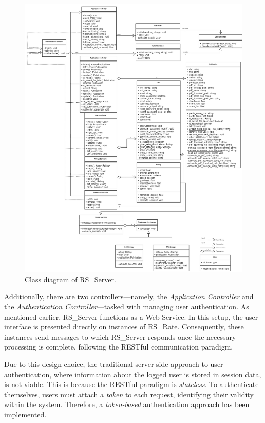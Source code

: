 \documentclass[a4paper, english]{article}
\newcommand{\rsserver}{RS\_Server\xspace}
\newcommand{\rsrate}{RS\_Rate\xspace}
\begin{document}
\begin{figure}[!tbp]
\centering
\includegraphics[scale=0.4]{figures/classi-1.png}
\caption{Class diagram of \rsserver.}
\label{fig:class-1}
\end{figure}

Additionally, there are two controllers—namely, the \emph{Application Controller} and the \emph{Authentication Controller}—tasked with managing user authentication. As mentioned earlier, \rsserver functions as a Web Service. In this setup, the user interface is presented directly on instances of \rsrate. Consequently, these instances send messages to which \rsserver responds once the necessary processing is complete, following the RESTful communication paradigm.

Due to this design choice, the traditional server-side approach to user authentication, where information about the logged user is stored in session data, is not viable. This is because the RESTful paradigm is \emph{stateless}. To authenticate themselves, users must attach a \emph{token} to each request, identifying their validity within the system. Therefore, a \emph{token-based} authentication approach has been implemented.
\end{document}
